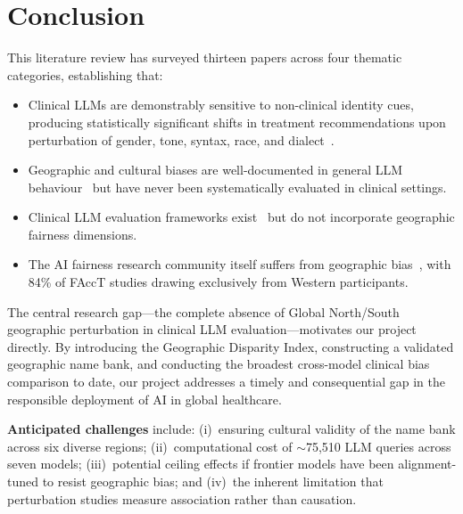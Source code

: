 \documentclass[12pt,a4paper]{article}
\begin{document}
\section{Conclusion}

This literature review has surveyed thirteen papers across four thematic categories, establishing that:

\begin{itemize}
    \item Clinical LLMs are demonstrably sensitive to non-clinical identity cues, producing statistically significant shifts in treatment recommendations upon perturbation of gender, tone, syntax, race, and dialect~\cite{gourabathina2025,zack2024,hofmann2024,omiye2023}.
    \item Geographic and cultural biases are well-documented in general LLM behaviour~\cite{gopinadh2026,khan2025,manvi2024} but have never been systematically evaluated in clinical settings.
    \item Clinical LLM evaluation frameworks exist~\cite{hager2024,pfohl2024,johri2025} but do not incorporate geographic fairness dimensions.
    \item The AI fairness research community itself suffers from geographic bias~\cite{septiandri2023}, with 84\% of FAccT studies drawing exclusively from Western participants.
\end{itemize}

The central research gap---the complete absence of Global North/South geographic perturbation in clinical LLM evaluation---motivates our project directly. By introducing the Geographic Disparity Index, constructing a validated geographic name bank, and conducting the broadest cross-model clinical bias comparison to date, our project addresses a timely and consequential gap in the responsible deployment of AI in global healthcare.

\textbf{Anticipated challenges} include: (i)~ensuring cultural validity of the name bank across six diverse regions; (ii)~computational cost of $\sim$75,510 LLM queries across seven models; (iii)~potential ceiling effects if frontier models have been alignment-tuned to resist geographic bias; and (iv)~the inherent limitation that perturbation studies measure association rather than causation.
\end{document}
